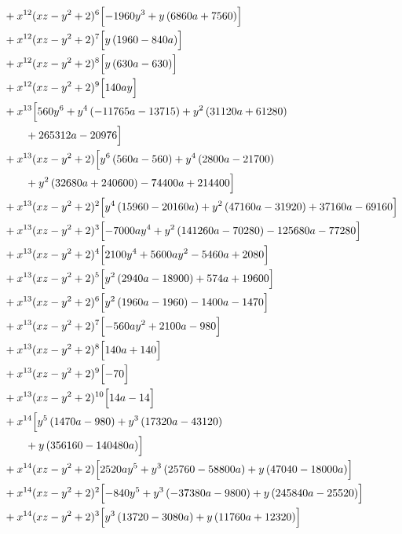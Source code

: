 \begin{align*}
&{}+x^{12}(xz-y^2+2)^{6}\Bigl[- 1960 y^{3} + y \left(6860 a + 7560\right)\Bigr]\\
&{}+x^{12}(xz-y^2+2)^{7}\Bigl[y \left(1960 - 840 a\right)\Bigr]\\
&{}+x^{12}(xz-y^2+2)^{8}\Bigl[y \left(630 a - 630\right)\Bigr]\\
&{}+x^{12}(xz-y^2+2)^{9}\Bigl[140 a y\Bigr]\\
&{}+x^{13}\Bigl[560 y^{6} + y^{4} \left(- 11765 a - 13715\right) + y^{2} \left(31120 a + 61280\right)\\
&\qquad + 265312 a - 20976\Bigr]\\
&{}+x^{13}(xz-y^2+2)\Bigl[y^{6} \left(560 a - 560\right) + y^{4} \left(2800 a - 21700\right)\\
&\qquad + y^{2} \left(32680 a + 240600\right) - 74400 a + 214400\Bigr]\\
&{}+x^{13}(xz-y^2+2)^{2}\Bigl[y^{4} \left(15960 - 20160 a\right) + y^{2} \left(47160 a - 31920\right) + 37160 a - 69160\Bigr]\\
&{}+x^{13}(xz-y^2+2)^{3}\Bigl[- 7000 a y^{4} + y^{2} \left(141260 a - 70280\right) - 125680 a - 77280\Bigr]\\
&{}+x^{13}(xz-y^2+2)^{4}\Bigl[2100 y^{4} + 5600 a y^{2} - 5460 a + 2080\Bigr]\\
&{}+x^{13}(xz-y^2+2)^{5}\Bigl[y^{2} \left(2940 a - 18900\right) + 574 a + 19600\Bigr]\\
&{}+x^{13}(xz-y^2+2)^{6}\Bigl[y^{2} \left(1960 a - 1960\right) - 1400 a - 1470\Bigr]\\
&{}+x^{13}(xz-y^2+2)^{7}\Bigl[- 560 a y^{2} + 2100 a - 980\Bigr]\\
&{}+x^{13}(xz-y^2+2)^{8}\Bigl[140 a + 140\Bigr]\\
&{}+x^{13}(xz-y^2+2)^{9}\Bigl[- 70\Bigr]\\
&{}+x^{13}(xz-y^2+2)^{10}\Bigl[14 a - 14\Bigr]\\
&{}+x^{14}\Bigl[y^{5} \left(1470 a - 980\right) + y^{3} \left(17320 a - 43120\right)\\
&\qquad + y \left(356160 - 140480 a\right)\Bigr]\\
&{}+x^{14}(xz-y^2+2)\Bigl[2520 a y^{5} + y^{3} \left(25760 - 58800 a\right) + y \left(47040 - 18000 a\right)\Bigr]\\
&{}+x^{14}(xz-y^2+2)^{2}\Bigl[- 840 y^{5} + y^{3} \left(- 37380 a - 9800\right) + y \left(245840 a - 25520\right)\Bigr]\\
&{}+x^{14}(xz-y^2+2)^{3}\Bigl[y^{3} \left(13720 - 3080 a\right) + y \left(11760 a + 12320\right)\Bigr]\\

\end{align*}

